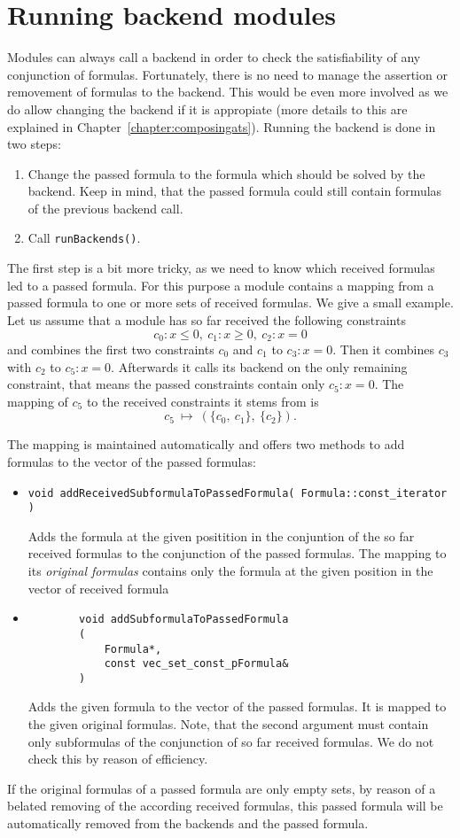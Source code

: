 \section{Running backend modules}
\label{sec:runbackend}
Modules can always call a backend in order to check the satisfiability of any conjunction of formulas.
Fortunately, there is no need to manage the assertion or removement of formulas to the backend. 
This would be even more involved as we do allow changing the
backend if it is appropiate (more details to this are explained in Chapter~\ref{chapter:composingats}).
Running the backend is done in two steps:
\begin{enumerate}
	\item Change the passed formula to the formula which should be solved by the backend. Keep in mind,
	       that the passed formula could still contain formulas of the previous backend call.
	\item Call \texttt{runBackends()}.
\end{enumerate}
The first step is a bit more tricky, as we need to know which received formulas led to a passed
formula. For this purpose a module contains a mapping from a passed formula to one or more
sets of received formulas. We give a small example. Let us assume that a module has so far received the following
constraints
$$c_0:x\leq0,\ c_1:x\geq 0,\ c_2:x=0$$
and combines the first two constraints $c_0$ and $c_1$ to $c_3:x=0$. Then it combines
$c_3$ with $c_2$ to $c_5:x=0$. Afterwards it calls its backend on the only remaining constraint,
that means the passed constraints contain only $c_5:x=0$. The mapping of $c_5$ to the received constraints it
stems from is $$c_5\ \mapsto\ (\{c_0,\ c_1\},\ \{c_2\}).$$

The mapping is maintained automatically and offers two methods to add formulas to the vector
of the passed formulas:
\begin{itemize}
	\item \begin{verbatim}void addReceivedSubformulaToPassedFormula( Formula::const_iterator )\end{verbatim}
		Adds the formula at the given positition in the conjuntion of the so far received formulas
		to the conjunction of the passed formulas. The mapping to its \emph{original formulas} contains
		only the formula at the given position in the vector of received formula
	\item
		\begin{verbatim}
		void addSubformulaToPassedFormula
		(
		    Formula*,
		    const vec_set_const_pFormula&
		)
		\end{verbatim}
		Adds the given formula to the vector of the passed formulas. It is mapped to the given
		original formulas. Note, that the second argument must contain only subformulas of the conjunction 
		of so far received formulas. We	do not check this by reason of efficiency.
\end{itemize}
If the original formulas of a passed formula are only empty sets, by reason of a belated removing of the according
received formulas, this passed formula will be automatically removed from the backends and the passed formula.

